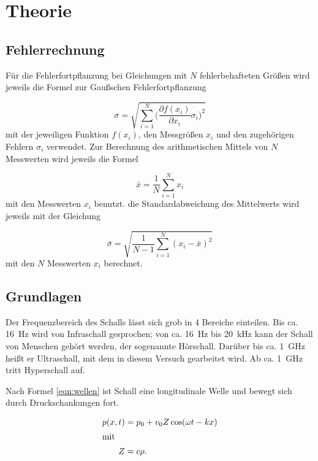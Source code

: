\section{Theorie}
\label{sec:Theorie}

\subsection{Fehlerrechnung}

Für die Fehlerfortpflanzung bei Gleichungen mit $N$ fehlerbehafteten Größen
wird jeweils die Formel zur Gaußschen Fehlerfortpflanzung

\begin{equation}
  \sigma = \sqrt{\sum_{i=1}^{N}\biggl(\frac{\partial f(x_i)}{\partial x_i}
  \sigma_i\biggr)^2}
\end{equation}
mit der jeweiligen Funktion $f(x_i)$, den Messgrößen $x_i$ und den
zugehörigen Fehlern $\sigma_i$ verwendet.
Zur Berechnung des arithmetischen Mittels von $N$ Messwerten wird jeweils die
Formel

\begin{equation}
  \bar{x} = \frac{1}{N}\sum_{i=1}^{N}x_i
\end{equation}
mit den Messwerten $x_i$ benutzt.
die Standardabweichung des Mittelwerts wird jeweils mit der Gleichung

\begin{equation}
  \bar{\sigma} = \sqrt{\frac{1}{N-1}\sum_{i=1}^{N}(x_i - \bar{x})^2}
\end{equation}
mit den $N$ Messwerten $x_i$ berechnet.

\subsection{Grundlagen}

Der Frequenzbereich des Schalls lässt sich grob in 4 Bereiche einteilen.
Bis ca. \SI{16}{\hertz} wird von Infraschall gesprochen; von ca. \SI{16}{\hertz} bis \SI{20}{\kilo\hertz}
kann der Schall von Menschen gehört werden, der sogenannte Hörschall. Darüber bis ca. \SI{1}{\giga\hertz}
heißt er Ultraschall, mit dem in diesem Versuch gearbeitet wird. Ab ca. \SI{1}{\giga\hertz}
tritt Hyperschall auf.

Nach Formel \eqref{eqn:wellen} ist Schall eine longitudinale Welle und bewegt sich
durch Druckschankungen fort.

\begin{align}
  p(x, t) &= p_0 + v_0 Z \cos(\omega t - k x)\label{eqn:wellen}\\
  \intertext{mit}
  Z &= c \rho. \label{eqn:impedanz}
\end{align}

